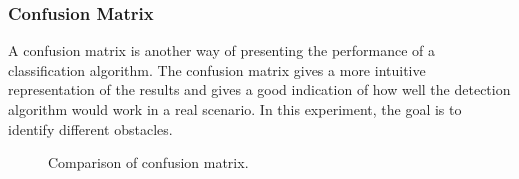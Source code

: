 \documentclass[sensors,article,submit,moreauthors,pdftex]{Definitions/mdpi}
\begin{document}
\subsubsection{Confusion Matrix}
A confusion matrix is another way of presenting the performance of a classification algorithm. The confusion matrix gives a more intuitive representation of the results and gives a good indication of how well the detection algorithm would work in a real scenario. In this experiment, the goal is to identify different obstacles.

\begin{figure}[htbp]
\centering
{}
\quad
{}
\caption{Comparison of confusion matrix.}
\label{fig:confusion matrix}
\end{figure}
\end{document}
